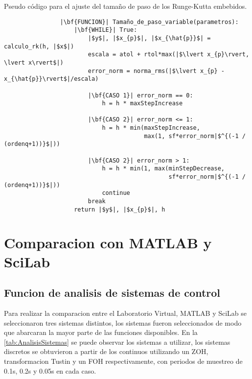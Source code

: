         \begin{longlisting}
            \caption[Pseudo código - Runge-Kutta embebidos]{Pseudo código para el ajuste del tamaño de paso de los Runge-Kutta embebidos.}
            \label{code:stepembebido}				
            \begin{verbatim}
                |\bf{FUNCION}| Tamaño_de_paso_variable(parametros):
                    |\bf{WHILE}| True:
                        |$y$|, |$x_{p}$|, |$x_{\hat{p}}$| = calculo_rk(h, |$x$|)
                        escala = atol + rtol*max(|$\lvert x_{p}\rvert, \lvert x\rvert$|)
                        error_norm = norma_rms(|$\lvert x_{p} - x_{\hat{p}}\rvert$|/escala)
                        
                        |\bf{CASO 1}| error_norm == 0:
                            h = h * maxStepIncrease
                        
                        |\bf{CASO 2}| error_norm <= 1:
                            h = h * min(maxStepIncrease,
                                        max(1, sf*error_norm|$^{(-1 / (ordenq+1))}$|))
                        
                        |\bf{CASO 2}| error_norm > 1:
                            h = h * min(1, max(minStepDecrease, 
                                               sf*error_norm|$^{(-1 / (ordenq+1))}$|))
                            continue
                        break
                    return |$y$|, |$x_{p}$|, h
            \end{verbatim}
        \end{longlisting}

\section{Comparacion con MATLAB y SciLab}

    \subsection{Funcion de analisis de sistemas de control}
        
        Para realizar la comparacion entre el Laboratorio Virtual, MATLAB y SciLab se seleccionaron tres sistemas distintos, los sistemas fueron seleccionados de modo que abarcaran la mayor parte de las funciones disponibles. En la \cref{tab:AnalisisSistemas} se puede observar los sistemas a utilizar, los sistemas discretos se obtuvieron a partir de los continuos utilizando un ZOH, transformacion Tustin y un FOH respectivamente, con periodos de muestreo de 0.1s, 0.2s y 0.05s en cada caso.

